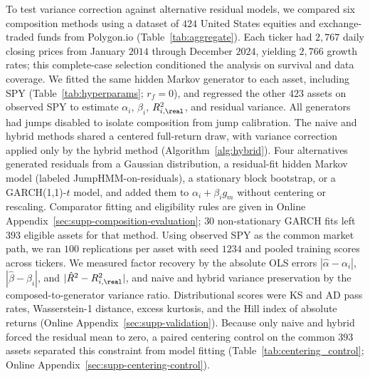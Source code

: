 To test variance correction against alternative residual models, we
compared six composition methods using a dataset of $424$ United
States equities and exchange-traded funds from Polygon.io (Table~\ref{tab:aggregate}).
Each ticker had $2{,}767$ daily closing prices from January $2014$
through December $2024$, yielding $2{,}766$ growth rates; this
complete-case selection conditioned the analysis on survival and data
coverage. We fitted the same hidden Markov generator to each asset,
including SPY (Table~\ref{tab:hyperparams}; $r_f=0$), and regressed
the other $423$ assets on observed SPY to estimate $\alpha_i$,
$\beta_i$, $R^2_{i,\real}$, and residual variance. All generators
had jumps disabled to isolate composition from jump calibration. The
naive and hybrid methods shared a centered full-return draw, with
variance correction applied only by the hybrid method
(Algorithm~\ref{alg:hybrid}). Four alternatives generated residuals
from a Gaussian distribution, a residual-fit hidden Markov model
(labeled JumpHMM-on-residuals), a stationary block bootstrap, or a
GARCH(1,1)-$t$ model, and added them to $\alpha_i+\beta_i g_m$
without centering or rescaling. Comparator fitting and eligibility
rules are given in Online Appendix~\ref{sec:supp-composition-evaluation};
$30$ non-stationary GARCH fits left $393$ eligible assets for that
method. Using observed SPY as the common market path, we ran $100$
replications per asset with seed $1234$ and pooled training scores
across tickers. We measured factor recovery by the absolute OLS
errors $|\hat\alpha-\alpha_i|$, $|\hat\beta-\beta_i|$, and
$|\hat R^2-R^2_{i,\real}|$, and naive and hybrid variance preservation
by the composed-to-generator variance ratio. Distributional scores
were KS and AD pass rates, Wasserstein-1 distance, excess kurtosis,
and the Hill index of absolute returns (Online
Appendix~\ref{sec:supp-validation}). Because only naive and hybrid
forced the residual mean to zero, a paired centering control on the
common $393$ assets separated this constraint from model fitting
(Table~\ref{tab:centering_control}; Online
Appendix~\ref{sec:supp-centering-control}).

